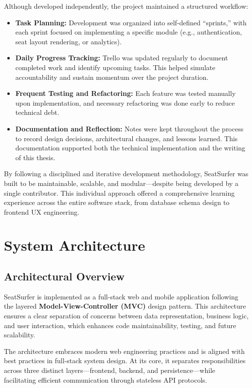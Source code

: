 \documentclass[12pt,a4paper]{report} %
\begin{document}
\noindent
Although developed independently, the project maintained a structured workflow:
\begin{itemize}
    \item \textbf{Task Planning:} Development was organized into self-defined “sprints,” with each sprint focused on implementing a specific module (e.g., authentication, seat layout rendering, or analytics).
    \item \textbf{Daily Progress Tracking:} Trello was updated regularly to document completed work and identify upcoming tasks. This helped simulate accountability and sustain momentum over the project duration.
    \item \textbf{Frequent Testing and Refactoring:} Each feature was tested manually upon implementation, and necessary refactoring was done early to reduce technical debt.
    \item \textbf{Documentation and Reflection:} Notes were kept throughout the process to record design decisions, architectural changes, and lessons learned. This documentation supported both the technical implementation and the writing of this thesis.
\end{itemize}

\noindent
By following a disciplined and iterative development methodology, SeatSurfer was built to be maintainable, scalable, and modular—despite being developed by a single contributor. This individual approach offered a comprehensive learning experience across the entire software stack, from database schema design to frontend UX engineering.

\newpage

\chapter{System Architecture}

\section{Architectural Overview}

SeatSurfer is implemented as a full-stack web and mobile application following the layered \textbf{Model-View-Controller (MVC)} design pattern. This architecture ensures a clear separation of concerns between data representation, business logic, and user interaction, which enhances code maintainability, testing, and future scalability.

The architecture embraces modern web engineering practices and is aligned with best practices in full-stack system design. At its core, it separates responsibilities across three distinct layers—frontend, backend, and persistence—while facilitating efficient communication through stateless API protocols.
\end{document}
